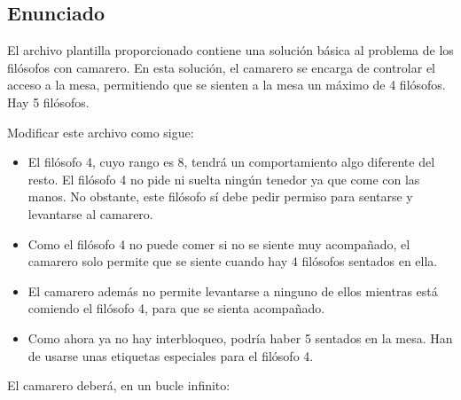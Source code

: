 \documentclass[a4paper,12pt]{article}
\begin{document}
\subsection{Enunciado}

El archivo plantilla proporcionado contiene una solución básica al problema de los filósofos con camarero. En esta solución, el camarero se encarga de controlar el acceso a la mesa, permitiendo que se sienten a la mesa un máximo de 4 filósofos. Hay 5 filósofos.

Modificar este archivo como sigue:

\begin{itemize}
    \item El filósofo 4, cuyo rango es 8, tendrá un comportamiento algo diferente del resto. El filósofo 4 no pide ni suelta ningún tenedor ya que come con las manos. No obstante, este filósofo sí debe pedir permiso para sentarse y levantarse al camarero.
    \item Como el filósofo 4 no puede comer si no se siente muy acompañado, el camarero solo permite que se siente cuando hay 4 filósofos sentados en ella.
    \item El camarero además no permite levantarse a ninguno de ellos mientras está comiendo el filósofo 4, para que se sienta acompañado.
    \item Como ahora ya no hay interbloqueo, podría haber 5 sentados en la mesa. Han de usarse unas etiquetas especiales para el filósofo 4.
\end{itemize}

El camarero deberá, en un bucle infinito:
\end{document}
